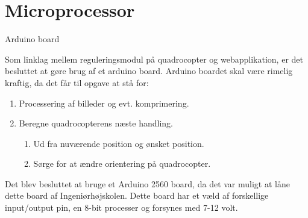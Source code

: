 \section{Microprocessor}

Arduino board 

Som linklag mellem reguleringsmodul på quadrocopter og webapplikation, er det besluttet at gøre brug af et arduino board. Arduino boardet skal være rimelig kraftig, da det får til opgave at stå for:   
\begin{enumerate}[label*=\arabic*.]
	\item Processering af billeder og evt. komprimering.
	\item Beregne quadrocopterens næste handling. 
	
	\begin{enumerate}[label*=\arabic*.]
		\item Ud fra nuværende position og ønsket position.
		\item Sørge for at ændre orientering på quadrocopter. 
	\end{enumerate}
\end{enumerate}

\vspace{1cm}

Det blev besluttet at bruge et Arduino 2560 board, da det var muligt at låne dette board af Ingeniørhøjskolen. Dette board har et væld af forskellige input/output pin, en 8-bit processer og forsynes med 7-12 volt.

